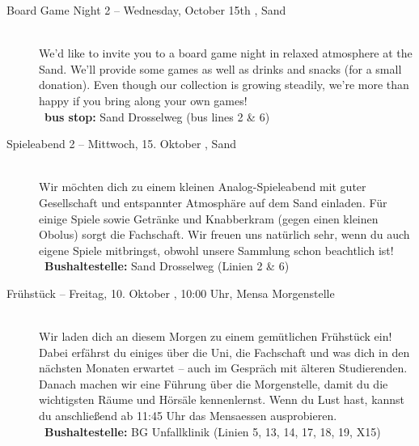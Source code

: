 \begin{description}
\ifml
    \item[Board Game Night 2 -- Wednesday, October 15th \YEAR, Sand]~\\%
    We'd like to invite you to a board game night in relaxed atmosphere at the Sand.
    We'll provide some games as well as drinks and snacks (for a small donation).
    Even though our collection is growing steadily, we're more than happy if you bring along your own games!\\
    ~\textbf{bus stop:} Sand Drosselweg (bus lines 2 \& 6)
\else
    \item[Spieleabend 2 -- Mittwoch, 15. Oktober \YEAR, Sand]~\\%
    Wir möchten dich zu einem kleinen Analog-Spieleabend mit guter Gesellschaft und entspannter Atmosphäre auf dem Sand einladen.
    Für einige Spiele sowie Getränke und Knabberkram (gegen einen kleinen Obolus) sorgt die Fachschaft.
    Wir freuen uns natürlich sehr, wenn du auch eigene Spiele mitbringst, obwohl unsere Sammlung schon beachtlich ist!\\
    ~\textbf{Bushaltestelle:} Sand Drosselweg (Linien 2 \& 6)
\fi

\ifbachelor
    \item[Frühstück -- Freitag, 10. Oktober \YEAR, 10:00 Uhr, Mensa Morgenstelle]\ \\
    Wir laden dich an diesem Morgen zu einem gemütlichen Frühstück ein! Dabei erfährst du einiges über die Uni, die Fachschaft und was dich in den nächsten Monaten erwartet -- auch im Gespräch mit älteren Studierenden.
    Danach machen wir eine Führung über die Morgenstelle, damit du die wichtigsten Räume und Hörsäle kennenlernst.
    Wenn du Lust hast, kannst du anschließend ab 11:45 Uhr das Mensaessen ausprobieren.\\
    ~\textbf{Bushaltestelle:} BG Unfallklinik (Linien 5, 13, 14, 17, 18, 19, X15)
\fi


\end{description}
